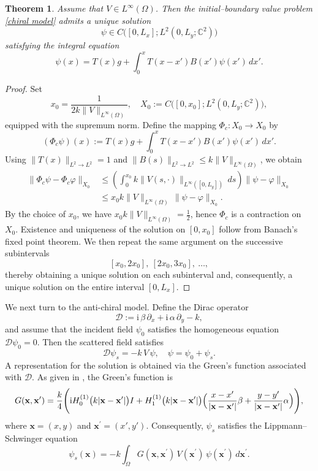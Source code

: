 \documentclass[12pt,reqno]{amsart}
\newtheorem{thm}{Theorem}[section]
\begin{document}
\begin{thm}
Assume that $V\in L^{\infty}(\Omega)$. Then the initial--boundary value problem \eqref{chiral model} admits a unique solution
\[
\psi\in C\bigl([0,L_x];L^2(0,L_y;\mathbb{C}^2)\bigr)
\]
satisfying the integral equation
\begin{equation}\label{iter of chiral}
    \psi(x)
    = T(x)g
    + \int_0^x T(x-x')B(x')\psi(x')\,dx'.
\end{equation}
\end{thm}

\begin{proof}
Set
\[
x_0=\frac{1}{2k\|V\|_{L^{\infty}(\Omega)}},
\quad
X_0:=C\bigl([0,x_0];L^2(0,L_y;\mathbb{C}^2)\bigr),
\]
equipped with the supremum norm. Define the mapping $\Phi_c:X_0\to X_0$ by
\[
(\Phi_c\psi)(x)
:=
T(x)g
+
\int_0^x T(x-x')B(x')\psi(x')\,dx'.
\]
Using $\|T(x)\|_{L^2\to L^2}=1$ and $\|B(s)\|_{L^2\to L^2}\le k\|V\|_{L^\infty(\Omega)}$, we obtain
\begin{align*}
    \|\Phi_c\psi-\Phi_c\varphi\|_{X_0}
&\leq
\left(\int_0^{x_0}k\|V(s,\cdot)\|_{L^\infty([0,L_y])}\,ds\right)\|\psi-\varphi\|_{X_0}\\
&\leq
 x_0 k\|V\|_{L^\infty(\Omega)}\,\|\psi-\varphi\|_{X_0}.
\end{align*}
By the choice of $x_0$,  we have $ x_0k\|V\|_{L^\infty(\Omega)}=\tfrac12$, hence $\Phi_c$ is a contraction on $X_0$. Existence and uniqueness of the solution on $[0,x_0]$ follow from Banach's fixed point theorem. We then repeat the same argument on the successive subintervals
\[
[x_0,2x_0],\ [2x_0,3x_0],\ \ldots,
\]
thereby obtaining a unique solution on each subinterval and, consequently, a unique solution on the entire interval $[0,L_x]$. 
\end{proof}

We next turn to the anti-chiral model. Define the Dirac operator
\[
\mathcal{D}:=\mathrm{i}\,\beta\,\partial_x+\mathrm{i}\,\alpha\,\partial_y-k,
\]
and assume that the incident field $\psi_0$ satisfies the homogeneous equation $\mathcal{D}\psi_0=0$. Then the scattered field satisfies
\[
\mathcal{D}\psi_s=-k\,V\,\psi,
\quad
\psi=\psi_0+\psi_s.
\]
A representation for the solution is obtained via the Green's function associated with $\mathcal{D}$. As given in \cite{quantum2023}, the Green's function is
\begin{equation}\label{Def of green}
G(\mathbf{x},\mathbf{x}^{\prime})
=\frac{k}{4}\Bigg(
\mathrm{i}H^{(1)}_0\bigl(k|\mathbf{x}-\mathbf{x}^{\prime}|\bigr)I
+
H^{(1)}_1\bigl(k|\mathbf{x}-\mathbf{x}^{\prime}|\bigr)
\Bigl(
\frac{x-x^{\prime}}{|\mathbf{x}-\mathbf{x}^{\prime}|}\beta
+
\frac{y-y^{\prime}}{|\mathbf{x}-\mathbf{x}^{\prime}|}\alpha
\Bigr)\Bigg),
\end{equation}
where $\mathbf{x}=(x,y)$ and $\mathbf{x}^{\prime}=(x',y')$.
Consequently, $\psi_s$ satisfies the Lippmann--Schwinger equation
\begin{equation}\label{iter of anti}
    \psi_s(\mathbf{x})
    =-k\int_{\Omega}G(\mathbf{x},\mathbf{x}^{\prime})\,V(\mathbf{x}^{\prime})\,\psi(\mathbf{x}^{\prime})\,d\mathbf{x}^{\prime}.
\end{equation}
\end{document}
